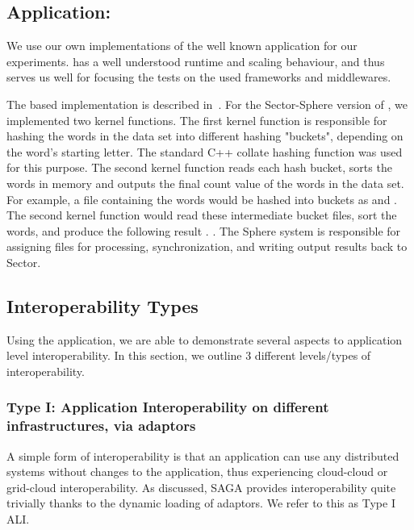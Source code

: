 \documentclass[3p,twocolumn]{elsarticle}
\begin{document}
\subsection{Application: \Wc}
\label{ssec:app}

We use our own implementations of the well known \wc application
for our experiments.  \Wc has a well understood runtime and
scaling behaviour, and thus serves us well for focusing the tests on
the used frameworks and middlewares.

The \mr based \wc implementation is described
in~\cite{saga_ccgrid09}.  For the Sector-Sphere version of \wc,
we implemented two kernel functions. The first kernel function is
responsible for hashing the words in the data set into different
hashing "buckets", depending on the word's starting letter.  The
standard C++ collate hashing function was used for this purpose.  The
second kernel function reads each hash bucket, sorts the words in
memory and outputs the final count value of the words in the data set.
For example, a file containing the words  would be hashed into buckets as  and
.  The second kernel function would read these
intermediate bucket files, sort the words, and produce the following
result .  .  The Sphere system is
responsible for assigning files for processing, synchronization, and
writing output results back to Sector.


\subsection{Interoperability Types}

Using the \wc application, we are able to demonstrate several
aspects to application level interoperability. In this section, we
outline 3 different levels/types of interoperability.


\subsubsection{Type I: Application Interoperability on different
  infrastructures, via adaptors}
%
%
A simple form of interoperability is that an application can use any
distributed systems without changes to the application, thus
experiencing cloud-cloud or grid-cloud interoperability.  As
discussed, SAGA provides interoperability quite trivially thanks to
the dynamic loading of adaptors.  We refer to this as Type I ALI.
\end{document}
